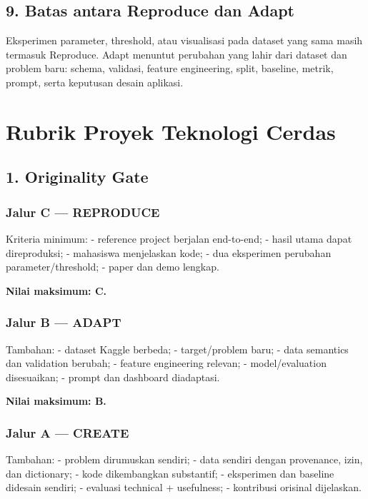 \documentclass[
  indonesian,
  letterpaper,
  DIV=11,
  numbers=noendperiod]{scrreprt}
\begin{document}
\section{9. Batas antara Reproduce dan
Adapt}\label{batas-antara-reproduce-dan-adapt}

Eksperimen parameter, threshold, atau visualisasi pada dataset yang sama
masih termasuk Reproduce. Adapt menuntut perubahan yang lahir dari
dataset dan problem baru: schema, validasi, feature engineering, split,
baseline, metrik, prompt, serta keputusan desain aplikasi.

\chapter{Rubrik Proyek Teknologi
Cerdas}\label{rubrik-proyek-teknologi-cerdas}

\section{1. Originality Gate}\label{originality-gate}

\subsection{Jalur C --- REPRODUCE}\label{jalur-c-reproduce-2}

Kriteria minimum: - reference project berjalan end-to-end; - hasil utama
dapat direproduksi; - mahasiswa menjelaskan kode; - dua eksperimen
perubahan parameter/threshold; - paper dan demo lengkap.

\textbf{Nilai maksimum: C.}

\subsection{Jalur B --- ADAPT}\label{jalur-b-adapt-2}

Tambahan: - dataset Kaggle berbeda; - target/problem baru; - data
semantics dan validation berubah; - feature engineering relevan; -
model/evaluation disesuaikan; - prompt dan dashboard diadaptasi.

\textbf{Nilai maksimum: B.}

\subsection{Jalur A --- CREATE}\label{jalur-a-create-2}

Tambahan: - problem dirumuskan sendiri; - data sendiri dengan
provenance, izin, dan dictionary; - kode dikembangkan substantif; -
eksperimen dan baseline didesain sendiri; - evaluasi technical +
usefulness; - kontribusi orisinal dijelaskan.
\end{document}
